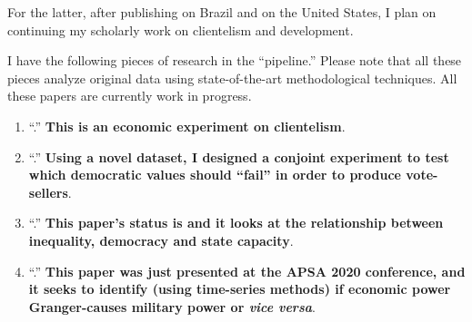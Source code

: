 \documentclass[10pt,stdletter,dateno,sigleft]{newlfm} %
\begin{document}
\begin{newlfm}
For the latter, after publishing \href{https://journals.sub.uni-hamburg.de/giga/jpla/article/view/1121/1128}{\emph{\unskip}} on Brazil and  \href{https://link.springer.com/article/10.1057/s41269-020-00174-4}{\emph{\unskip}} on the United States, I plan on continuing my scholarly work on clientelism and development. 

I have the following pieces of research in the ``pipeline.'' Please note that all these pieces analyze original data using state-of-the-art methodological techniques. All these papers are currently work in progress.

\begin{enumerate}

  \item ``\href{https://github.com/hbahamonde/Economic_Experiment_Vote_Selling/raw/master/Vote_Selling_Bahamonde_Canales_Paper.pdf}{{\unskip}}.'' {\bf This is an economic experiment on clientelism}. {\unskip}

  \item ``\href{https://github.com/hbahamonde/Conjoint_US/raw/master/Bahamonde_Quininao_Conjoint.pdf}{{\unskip}}.'' {\bf Using a novel dataset, I designed a conjoint experiment to test which democratic values should ``fail'' in order to produce vote-sellers}. {\unskip}

  \item ``\href{https://github.com/hbahamonde/Inequality_State_Capacities/raw/master/Paper_EJPE_Under_Review.pdf}{{\unskip}}.'' {\bf This paper's status is {\unskip} and it looks at the relationship between inequality, democracy and state capacity}. {\unskip}

  \item ``\href{https://github.com/hbahamonde/Bahamonde_Kovac/raw/master/Bahamonde_Kovac.pdf}{{\unskip}}.'' {\bf This paper was just presented at the APSA 2020 conference, and it seeks to identify (using time-series methods) if economic power Granger-causes military power or \emph{vice versa}}. {\unskip}


\end{enumerate}
\end{newlfm}
\end{document}
